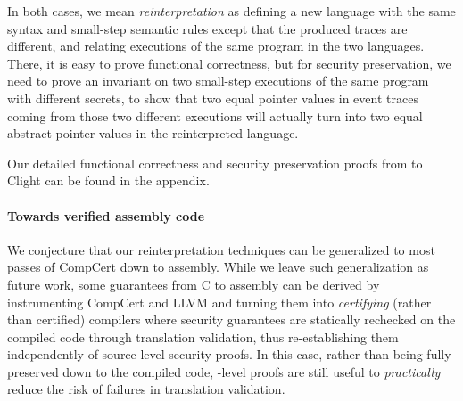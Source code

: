 In both cases, we mean \emph{reinterpretation} as defining a new
language with the same syntax and small-step semantic rules except
that the produced traces are different, and relating executions of
the same program in the two languages. There, it is easy to prove
functional correctness, but for security preservation, we need to
prove an invariant on two small-step executions of the same program
with different secrets, to show that two equal pointer values in event
traces coming from those two different executions will actually turn
into two equal abstract pointer values in the reinterpreted language.

Our detailed functional correctness and security preservation proofs
from \lamstar to Clight can be found in the appendix.

\paragraph{Towards verified assembly code}
We conjecture that our reinterpretation techniques can be generalized to most passes
of CompCert down to assembly. %
While we leave such generalization as future work, some guarantees
from C to assembly can be derived by instrumenting CompCert \cite{barthe-ccs2014}
and LLVM \cite{DBLP:conf/popl/ZhaoNMZ12,DBLP:conf/pldi/ZhaoNMZ13,almeida-usenix2016} 
and turning them into \emph{certifying} (rather than certified) compilers where
security guarantees are statically rechecked on the compiled code
through translation validation, thus re-establishing them
independently of source-level security proofs. In this case, rather
than being fully preserved down to the compiled code,
\lowstar-level proofs are still useful to \emph{practically} reduce the
risk of failures in translation validation.

